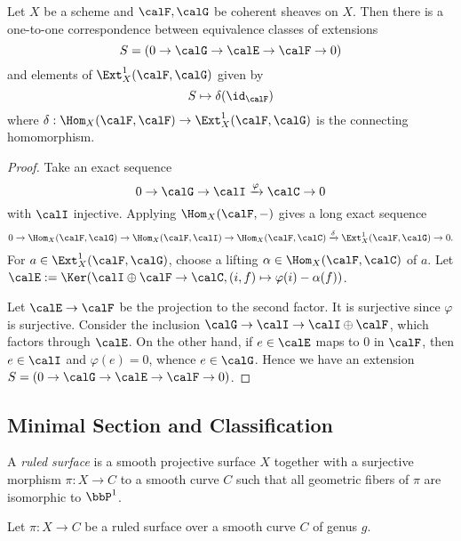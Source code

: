     \begin{proposition}\label{prop:extension_and_Ext1}
        Let \(X\) be a scheme and \(\calF,\calG\) be coherent sheaves on \(X\).
        Then there is a one-to-one correspondence between equivalence classes of extensions
        \[ S = (0 \to \calG \to \calE \to \calF \to 0) \]
        and elements of \(\Ext^1_X(\calF,\calG)\) given by 
        \[ S \mapsto \delta(\id_{\calF}) \]
        where \(\delta:\Hom_X(\calF,\calF) \to \Ext^1_X(\calF,\calG)\) is the connecting homomorphism.
    \end{proposition}
    \begin{proof}
        Take an exact sequence
        \[ 0 \to \calG \to \calI \xrightarrow{\varphi} \calC \to 0 \] 
        with \(\calI\) injective.
        Applying \(\Hom_X(\calF,-)\) gives a long exact sequence
        \[ 0 \to \Hom_X(\calF,\calG) \to \Hom_X(\calF,\calI) \to \Hom_X(\calF,\calC) \xrightarrow{\delta} \Ext^1_X(\calF,\calG) \to 0. \]
        For \(a \in \Ext^1_X(\calF,\calG)\), choose a lifting \(\alpha \in \Hom_X(\calF,\calC)\) of \(a\).
        Let \(\calE := \Ker (\calI \oplus \calF \to \calC, (i,f) \mapsto \varphi(i) - \alpha(f))\).

        Let \(\calE \to \calF\) be the projection to the second factor.
        It is surjective since \(\varphi\) is surjective.
        Consider the inclusion \(\calG \to \calI \to \calI \oplus \calF\), which factors through \(\calE\).
        On the other hand, if \(e \in \calE\) maps to \(0\) in \(\calF\), then \(e \in \calI\) and \(\varphi(e) = 0\), whence \(e \in \calG\).
        Hence we have an extension \(S = (0 \to \calG \to \calE \to \calF \to 0)\).

    \end{proof}

\subsection{Minimal Section and Classification}

    \begin{definition}\label{def:ruled_surface}
        A \emph{ruled surface} is a smooth projective surface \(X\) together with a surjective morphism \(\pi:X \to C\) to a smooth curve \(C\) 
        such that all geometric fibers of \(\pi\) are isomorphic to \(\bbP^1\).
    \end{definition}

    Let \(\pi:X \to C\) be a ruled surface over a smooth curve \(C\) of genus \(g\).

